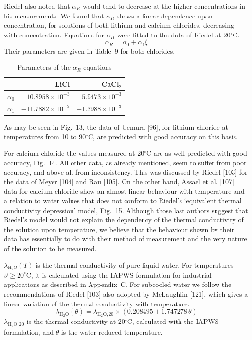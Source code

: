 \documentclass[11pt]{article}
\begin{document}
Riedel also noted that $\alpha_R$ would tend to decrease at the higher concentrations in
his measurements. We found that $\alpha_R$ shows a linear dependence upon concentration,
for solutions of both lithium and calcium chlorides, decreasing with concentration.
Equations for $\alpha_R$ were fitted to the data of Riedel at 20$^{\circ}$C.
\begin{equation}
\alpha_R = \alpha_0 + \alpha_1 \xi
\end{equation}
Their parameters are given in Table~9 for both chlorides.

\begin{table}[htbp]
\centering
\caption{Parameters of the $\alpha_R$ equations}
\begin{tabular}{lrr}
\toprule
 & LiCl & CaCl$_2$ \\
\midrule
$\alpha_0$ & $10.8958\times 10^{-3}$ & $5.9473\times 10^{-3}$ \\
$\alpha_1$ & $-11.7882\times 10^{-3}$ & $-1.3988\times 10^{-3}$ \\
\bottomrule
\end{tabular}
\end{table}

As may be seen in Fig.~13, the data of Uemura [96], for lithium chloride at temperatures
from 10 to 90$^{\circ}$C, are predicted with good accuracy on this basis.

For calcium chloride the values measured at 20$^{\circ}$C are as well predicted with good
accuracy, Fig.~14. All other data, as already mentioned, seem to suffer from poor accuracy,
and above all from inconsistency. This was discussed by Riedel [103] for the data of Meyer
[104] and Rau [105]. On the other hand, Assael et al. [107] data for calcium chloride show
an almost linear behaviour with temperature and a relation to water values that does not
conform to Riedel's `equivalent thermal conductivity depression' model, Fig.~15. Although
those last authors suggest that Riedel's model would not explain the dependency of the
thermal conductivity of the solution upon temperature, we believe that the behaviour shown
by their data has essentially to do with their method of measurement and the very nature
of the solution to be measured.

$\lambda_{\mathrm{H_2O}}(T)$ is the thermal conductivity of pure liquid water. For
temperatures $\vartheta \ge 20^{\circ}$C, it is calculated using the IAPWS formulation for
industrial applications as described in Appendix~C. For subcooled water we follow the
recommendations of Riedel [103] also adopted by McLaughlin [121], which gives a linear
variation of the thermal conductivity with temperature:
\begin{equation}
\lambda_{\mathrm{H_2O}}(\theta) = \lambda_{\mathrm{H_2O,20}} \times (0.208495 +
1.747278\,\theta)
\end{equation}
$\lambda_{\mathrm{H_2O,20}}$ is the thermal conductivity at 20$^{\circ}$C, calculated with
the IAPWS formulation, and $\theta$ is the water reduced temperature.
\end{document}
